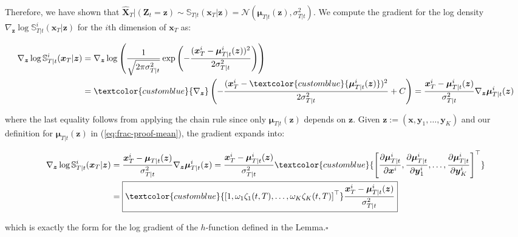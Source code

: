 \documentclass{article}
\newcommand{\bluetext}[1]{\textcolor{customblue}{#1}}
\begin{document}
Therefore, we have shown that $\widehat{\boldsymbol{X}}_T|(\boldsymbol{Z}_t=\boldsymbol{z})\sim \mathbb{S}_{T|t}(\boldsymbol{x}_T|\boldsymbol{z})=\mathcal{N}(\boldsymbol{\mu}_{T|t}(\boldsymbol{z}), \sigma_{T|t}^2)$. We compute the gradient for the log density $\nabla_{\boldsymbol{z}}\log\mathbb{S}^i_{T|t}(\boldsymbol{x}_T|\boldsymbol{z})$ for the $i$th dimension of $\boldsymbol{x}_T$ as:
\begin{small}
\begin{align}
    \nabla_{\boldsymbol{z}}\log\mathbb{S}^i_{T|t}(\boldsymbol{x}_T|\boldsymbol{z})&=\nabla_{\boldsymbol{z}}\log \left(\frac{1}{\sqrt{2\pi\sigma^2_{T|t}}}\exp\left(-\frac{(\boldsymbol{x}^i_T-\boldsymbol{\mu}^i_{T|t}(\boldsymbol{z}))^2}{2\sigma^2_{T|t}}\right)\right)\nonumber\\
    &=\bluetext{\nabla_{\boldsymbol{z}}} \left(-\frac{(\boldsymbol{x}^i_T-\bluetext{\boldsymbol{\mu}^i_{T|t}(\boldsymbol{z})})^2}{2\sigma^2_{T|t}}+C\right)=\frac{\boldsymbol{x}^i_T-\boldsymbol{\mu}^i_{T|t}(\boldsymbol{z})}{\sigma_{T|t}^2}\nabla_{\boldsymbol{z}}\boldsymbol{\mu}^i_{T|t}(\boldsymbol{z})
\end{align}
\end{small}
where the last equality follows from applying the chain rule since only $\boldsymbol{\mu}_{T|t}(\boldsymbol{z})$ depends on $\boldsymbol{z}$. Given $\boldsymbol{z}:=(\boldsymbol{x},\boldsymbol{y}_1, \dots, \boldsymbol{y}_K)$ and our definition for $\boldsymbol{\mu}_{T|t}(\boldsymbol{z})$ in (\ref{eq:frac-proof-mean}), the gradient expands into:
\begin{small}
\begin{align}
    \nabla_{\boldsymbol{z}}\log\mathbb{S}^i_{T|t}(\boldsymbol{x}_T|\boldsymbol{z})&=\frac{\boldsymbol{x}^i_T-\boldsymbol{\mu}_{T|t}(\boldsymbol{z})}{\sigma_{T|t}^2}\nabla_{\boldsymbol{z}}\boldsymbol{\mu}^i_{T|t}(\boldsymbol{z})=\frac{\boldsymbol{x}^i_T-\boldsymbol{\mu}^i_{T|t}(\boldsymbol{z})}{\sigma_{T|t}^2}\bluetext{\left[\frac{\partial \boldsymbol{\mu}^i_{T|t}}{\partial \boldsymbol{x}^i}, \frac{\partial \boldsymbol{\mu}^i_{T|t}}{\partial \boldsymbol{y}^i_1}, \dots, \frac{\partial \boldsymbol{\mu}^i_{T|t}}{\partial \boldsymbol{y}^i_K}\right]^\top}\nonumber\\
    &=\boxed{\bluetext{\left[1,\omega_1\zeta_1(t,T),\dots, \omega_K\zeta_K(t,T) \right]^\top}\frac{\boldsymbol{x}^i_T-\boldsymbol{\mu}^i_{T|t}(\boldsymbol{z})}{\sigma_{T|t}^2}}
\end{align}
\end{small}
which is exactly the form for the log gradient of the $h$-function defined in the Lemma.\hfill $\square$
\end{document}
